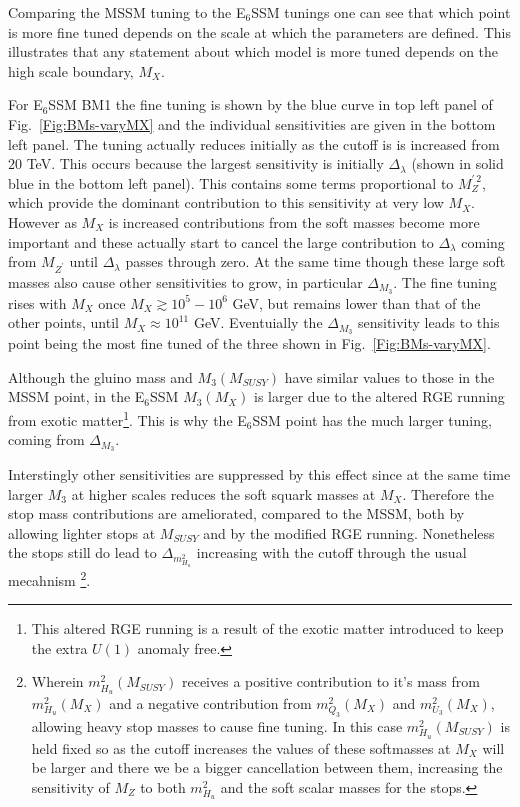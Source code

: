 \documentclass[preprint,amsmath,amssymb,aps,superscriptaddress,prd,showpacs,floatfix,nofootinbib]{revtex4-1}
\begin{document}
Comparing the MSSM tuning to the E$_6$SSM tunings one can see that
which point is more fine tuned depends on the scale at which the
parameters are defined.  This illustrates that any statement about
which model is more tuned depends on the high scale boundary, $M_X$.

For E$_6$SSM BM1 the fine tuning is shown by the blue curve in top
left panel of Fig.~\ref{Fig:BMs-varyMX} and the individual
sensitivities are given in the bottom left panel. The tuning actually
reduces initially as the cutoff is is increased from $20$ TeV.  This
occurs because the largest sensitivity is initially $\Delta_\lambda$
(shown in solid blue in the bottom left panel).  This contains some
terms proportional to $M_Z^{\prime \, 2}$, which provide the dominant
contribution to this sensitivity at very low $M_X$.  However as $M_X$
is increased contributions from the soft masses become more important
and these actually start to cancel the large contribution to
$\Delta_\lambda$ coming from $M_{Z^\prime}$ until $\Delta_\lambda$
passes through zero.  At the same time though these large soft masses
also cause other sensitivities to grow, in particular $\Delta_{M_3}$.
The fine tuning rises with $M_X$ once $M_X \gtrsim 10^5-10^6$ GeV,
but remains lower than that of the other points, until $M_X \approx
10^{11}$ GeV.  Eventuially the $\Delta_{M_3}$ sensitivity leads to
this point being the most fine tuned of the three shown in
Fig.~\ref{Fig:BMs-varyMX}.

 Although the gluino mass and $M_3(M_{SUSY})$ have similar values to
 those in the MSSM point, in the E$_6$SSM $M_3(M_X)$ is larger
 due to the altered RGE running from exotic matter\footnote{This
   altered RGE running is a result of the exotic matter introduced to
   keep the extra $U(1)$ anomaly free. }. This is why the E$_6$SSM
 point has the much larger tuning, coming from $\Delta_{M_3}$.


Interstingly other sensitivities are suppressed by this effect since
at the same time larger $M_3$ at higher scales reduces the soft squark
masses at $M_X$.  Therefore the stop mass contributions are
ameliorated, compared to the MSSM, both by allowing lighter stops at
$M_{SUSY}$ and by the modified RGE running.  Nonetheless the stops
still do lead to $\Delta_{m_{H_u}^2}$ increasing with the cutoff
through the usual mecahnism \footnote{Wherein $m_{H_u}^2(M_{SUSY})$
  receives a positive contribution to it's mass from $m_{H_u}^2(M_X)$
  and a negative contribution from $m_{Q_3}^2(M_X)$ and
  $m_{U_3}^2(M_X)$, allowing heavy stop masses to cause fine
  tuning. In this case $m_{H_u}^2(M_{SUSY})$ is held fixed so as the
  cutoff increases the values of these softmasses at $M_X$ will be
  larger and there we be a bigger cancellation between them,
  increasing the sensitivity of $M_Z$ to both $m_{H_u}^2$ and the soft
  scalar masses for the stops.}.
\end{document}

